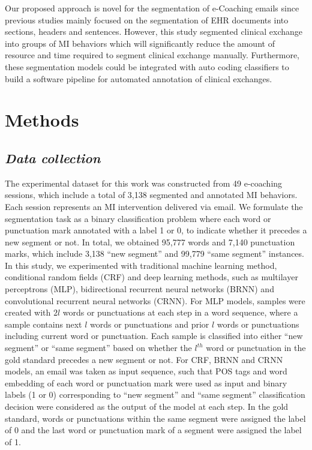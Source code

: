 \documentclass{amia}
\begin{document}
Our proposed approach is novel for the segmentation of e-Coaching emails since previous studies mainly focused on the segmentation of EHR documents into sections, headers and sentences. However, this study segmented clinical exchange into groups of MI behaviors which will significantly reduce the amount of resource and time required to segment clinical exchange manually. Furthermore, these segmentation models could be integrated with auto coding classifiers to build a software pipeline for automated annotation of clinical exchanges.
  
\section*{Methods}
\subsection*{\textit{Data collection}}

The experimental dataset for this work was constructed from 49 e-coaching sessions, which include a total of 3,138 segmented and annotated MI behaviors. Each session represents an MI intervention delivered via email. We formulate the segmentation task as a binary classification problem where each word or punctuation mark annotated with a label 1 or 0, to indicate whether it precedes a new segment or not. In total, we obtained 95,777 words and 7,140 punctuation marks, which include 3,138 ``new segment'' and 99,779 ``same segment'' instances. In this study, we experimented with traditional machine learning method, conditional random fields (CRF)\cite{lafferty2001conditional} and deep learning methods, such as multilayer perceptrons (MLP),\cite{rumelhart1986learning} bidirectional recurrent neural networks (BRNN)\cite{schuster1997bidirectional} and convolutional recurrent neural networks (CRNN).\cite{treviso2017sentence} For MLP models, samples were created with $2l$ words or punctuations at each step in a word sequence, where a sample contains next $l$ words or punctuations and prior $l$ words or punctuations including current word or punctuation. Each sample is classified into either ``new segment'' or ``same segment'' based on whether the $l^{th}$ word or punctuation in the gold standard precedes a new segment or not. For CRF, BRNN and CRNN models, an email was taken as input sequence, such that POS tags and word embedding of each word or punctuation mark were used as input and binary labels (1 or 0) corresponding to ``new segment'' and ``same segment'' classification decision were considered as the output of the model at each step. In the gold standard, words or punctuations within the same segment were assigned the label of 0 and the last word or punctuation mark of a segment were assigned the label of 1.     
\end{document}
